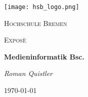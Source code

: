 \begin{titlepage}
	\centering
	\texttt{[image: hsb\_logo.png]}
	\par\vspace{1cm}
	{\scshape\LARGE Hochschule Bremen \par}
	\vspace{1cm}
	{\scshape\Large Exposè \par}
	\vspace{1.5cm}
	{\huge\bfseries Medieninformatik Bsc.\par}
	\vspace{2cm}
	{\Large\itshape Roman Quistler \par}
	\vfill

	\vfill

	{\large \today\par}
\end{titlepage}